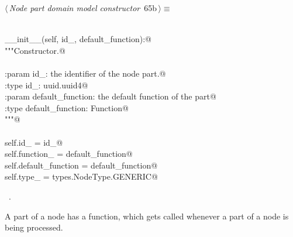 \documentclass[
    a4paper,      %
    10pt,         %
    openright,    %
    notitlepage,  %
    parskip=half, %
]{scrreprt}       %
\theoremstyle{definition}                    %
\begin{document}
\begin{flushleft} \small
\begin{minipage}{\linewidth}\label{scrap107}\raggedright\small
{} $\langle\,${\itshape Node part domain model constructor}\nobreak\ {\footnotesize {65b}}$\,\rangle\equiv$
\vspace{-1exm}
\begin{list}{}{} \item
\mbox{}\lstinline@@\\
\mbox{}\lstinline@def __init__(self, id_, default_function):@\\
\mbox{}\lstinline@    """Constructor.@\\
\mbox{}\lstinline@@\\
\mbox{}\lstinline@    :param id_: the identifier of the node part.@\\
\mbox{}\lstinline@    :type  id_: uuid.uuid4@\\
\mbox{}\lstinline@    :param default_function: the default function of the part@\\
\mbox{}\lstinline@    :type default_function: Function@\\
\mbox{}\lstinline@    """@\\
\mbox{}\lstinline@@\\
\mbox{}\lstinline@    self.id_              = id_@\\
\mbox{}\lstinline@    self.function_        = default_function@\\
\mbox{}\lstinline@    self.default_function = default_function@\\
\mbox{}\lstinline@    self.type_            = types.NodeType.GENERIC@{\NWsep}
\end{list}
\vspace{-1.5ex}
\footnotesize
\begin{list}{}{\setlength{\itemsep}{-\parsep}\setlength{\itemindent}{-\leftmargin}}
\item \NWtxtMacroRefIn\ .

\item{}
\end{list}
\end{minipage}\vspace{4ex}
\end{flushleft}
A part of a node has a function, which gets called whenever a part of a node is
being processed.
\end{document}

